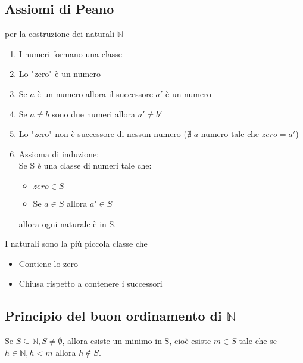 \subsection{Assiomi di Peano} per la costruzione dei naturali \(\mathbb{N}\)
\begin{enumerate}
    \item I numeri formano una classe
    \item Lo "zero" è un numero
    \item Se \(a\) è un numero allora il successore \(a'\) è un numero
    \item Se \(a\neq b\) sono due numeri allora \(a'\neq b'\)
    \item Lo "zero" non è successore di nessun numero (\(\nexists \; a\) numero tale che \(zero=a'\))
    \item Assioma di induzione:
    \\Se S è una classe di numeri tale che:
    \begin{itemize}
        \item \(zero\in S\)
        \item Se \(a\in S\) allora \(a'\in S\)
    \end{itemize}
    allora ogni naturale è in S.
\end{enumerate}
I naturali sono la più piccola classe che 
\begin{itemize}
    \item Contiene lo zero
    \item Chiusa rispetto a contenere i successori
\end{itemize}

\subsection{Principio del buon ordinamento di \(\mathbb{N}\)} 
Se \(S\subseteq \mathbb{N}, S\neq\emptyset\), allora esiste un minimo in S, cioè esiste \(m\in S\) tale che se \(h\in\mathbb{N}, h<m\) allora \(h\notin S\).

